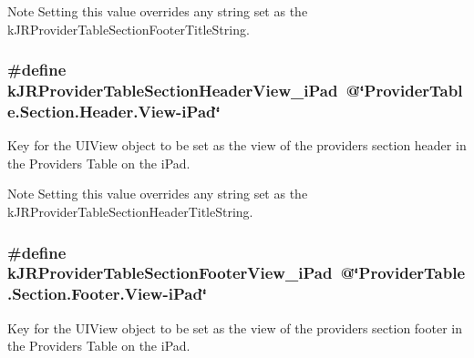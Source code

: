 \begin{DoxyNote}{Note}
Setting this value overrides any string set as the kJRProviderTableSectionFooterTitleString. 
\end{DoxyNote}
\hypertarget{group__custom_interface_ga7dcb3488390fabe1f3a358fb5af1e42c}{
\subsubsection[{kJRProviderTableSectionHeaderView\_\-iPad}]{\setlength{\rightskip}{0pt plus 5cm}\#define kJRProviderTableSectionHeaderView\_\-iPad~@\char`\"{}ProviderTable.Section.Header.View-\/iPad\char`\"{}}}
\label{group__custom_interface_ga7dcb3488390fabe1f3a358fb5af1e42c}
Key for the {\ttfamily UIView} object to be set as the view of the providers section header in the Providers Table on the iPad.

\begin{DoxyNote}{Note}
Setting this value overrides any string set as the kJRProviderTableSectionHeaderTitleString. 
\end{DoxyNote}
\hypertarget{group__custom_interface_gaa2196cc44d4e0dc4de9e98248c8a7e10}{
\subsubsection[{kJRProviderTableSectionFooterView\_\-iPad}]{\setlength{\rightskip}{0pt plus 5cm}\#define kJRProviderTableSectionFooterView\_\-iPad~@\char`\"{}ProviderTable.Section.Footer.View-\/iPad\char`\"{}}}
\label{group__custom_interface_gaa2196cc44d4e0dc4de9e98248c8a7e10}
Key for the {\ttfamily UIView} object to be set as the view of the providers section footer in the Providers Table on the iPad.

